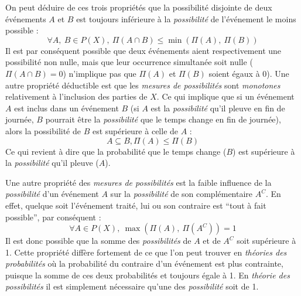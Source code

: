 On peut déduire de ces trois propriétés \autocite{Bouchon-Meunier2007}
que la possibilité disjointe de deux événements \(A\) et \(B\) est
toujours inférieure à la \emph{possibilité} de l'événement le moins
possible :
%
\begin{equation}
  ∀ A,\ B ∈ P(X),\ Π(A ∩ B) ≤ \min(Π(A),\ Π(B))
\end{equation}
%
Il est par conséquent possible que deux événements aient
respectivement une possibilité non nulle, mais que leur occurrence
simultanée soit nulle (\( Π(A ∩ B) = 0\)) n'implique pas que \(Π(A)\)
et \(Π(B)\) soient égaux à 0). Une autre propriété déductible est que
les \emph{mesures de possibilités} sont \emph{monotones} relativement
à l'inclusion des parties de \(X\). Ce qui implique que si un
événement \(A\) est inclus dans un événement \(B\) (\eg si \(A\) est
la \emph{possibilité} qu'il pleuve en fin de journée, \(B\) pourrait
être la \emph{possibilité} que le temps change en fin de journée),
alors la possibilité de \(B\) est supérieure à celle de \(A\) :
%
\begin{equation}
  A \subseteq B, Π(A) ≤ Π(B)
\end{equation}
%
Ce qui revient à dire que la probabilité que le temps change (\(B\))
est supérieure à la \emph{possibilité} qu'il pleuve (\(A\)).

Une autre propriété des \emph{mesures de possibilités} est la faible
influence de la \emph{possibilité} d'un événement \(A\) sur la
\emph{possibilité} de son complémentaire \(A^C\). En effet, quelque
soit l’événement traité, lui ou son contraire est \enquote{tout à fait
  possible}, par conséquent :
%
\begin{equation}
  \label{eq:poss_cont}
  ∀ A ∈ P(X),\ \max(Π(A),\ Π(A^C)) = 1  
\end{equation}
%
Il est donc possible que la somme des \emph{possibilités} de \(A\) et
de \(A^C\) soit supérieure à 1. Cette propriété diffère fortement de
ce que l'on peut trouver en \emph{théories des probabilités} où la
probabilité du contraire d'un événement est plus contrainte, puisque
la somme de ces deux probabilités et toujours égale à 1. En
\emph{théorie des possibilités} il est simplement nécessaire qu'une
des \emph{possibilité} soit de 1.

